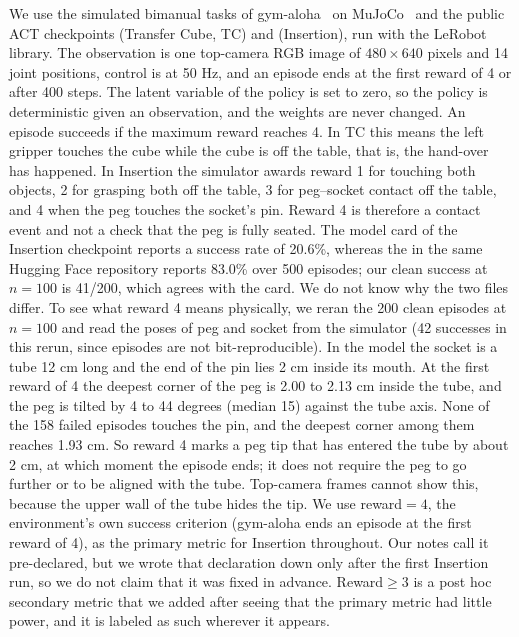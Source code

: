 \documentclass[11pt]{article}
\begin{document}
We use the simulated bimanual tasks of gym-aloha~\cite{cadene2024lerobot} on MuJoCo~\cite{todorov2012mujoco} and the public ACT checkpoints  (Transfer Cube, TC) and  (Insertion), run with the LeRobot library. The observation is one top-camera RGB image of $480{\times}640$ pixels and 14 joint positions, control is at 50 Hz, and an episode ends at the first reward of 4 or after 400 steps. The latent variable of the policy is set to zero, so the policy is deterministic given an observation, and the weights are never changed. An episode succeeds if the maximum reward reaches 4. In TC this means the left gripper touches the cube while the cube is off the table, that is, the hand-over has happened. In Insertion the simulator awards reward 1 for touching both objects, 2 for grasping both off the table, 3 for peg--socket contact off the table, and 4 when the peg touches the socket's pin. Reward 4 is therefore a contact event and not a check that the peg is fully seated. The model card of the Insertion checkpoint reports a success rate of 20.6\%, whereas the  in the same Hugging Face repository reports 83.0\% over 500 episodes; our clean success at $n{=}100$ is 41/200, which agrees with the card. We do not know why the two files differ. To see what reward 4 means physically, we reran the 200 clean episodes at $n{=}100$ and read the poses of peg and socket from the simulator (42 successes in this rerun, since episodes are not bit-reproducible). In the model the socket is a tube 12 cm long and the end of the pin lies 2 cm inside its mouth. At the first reward of 4 the deepest corner of the peg is 2.00 to 2.13 cm inside the tube, and the peg is tilted by 4 to 44 degrees (median 15) against the tube axis. None of the 158 failed episodes touches the pin, and the deepest corner among them reaches 1.93 cm. So reward 4 marks a peg tip that has entered the tube by about 2 cm, at which moment the episode ends; it does not require the peg to go further or to be aligned with the tube. Top-camera frames cannot show this, because the upper wall of the tube hides the tip. We use reward${=}4$, the environment's own success criterion (gym-aloha ends an episode at the first reward of 4), as the primary metric for Insertion throughout. Our notes call it pre-declared, but we wrote that declaration down only after the first Insertion run, so we do not claim that it was fixed in advance. Reward${\ge}3$ is a post hoc secondary metric that we added after seeing that the primary metric had little power, and it is labeled as such wherever it appears.
\end{document}
